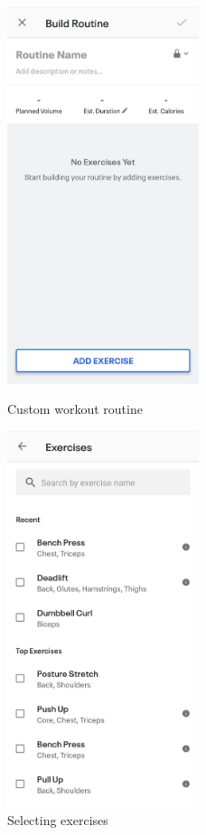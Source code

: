 \begin{figure}[H]
    \begin{minipage}{0.5\textwidth}
        \centering
        \includegraphics[width=0.5\textwidth]{myfitnesspal/exercise-routines.jpeg}
        \caption{Custom workout routine}
        \label{fig:mfp-workouts}
    \end{minipage}%
    \begin{minipage}{0.5\textwidth}
        \centering
        \includegraphics[width=0.5\textwidth]{myfitnesspal/exercise-choice.jpeg}
        \caption{Selecting exercises}
        \label{fig:mfp-exercise-picker}
    \end{minipage}
    \label{fig:mfp-screens}
\end{figure}